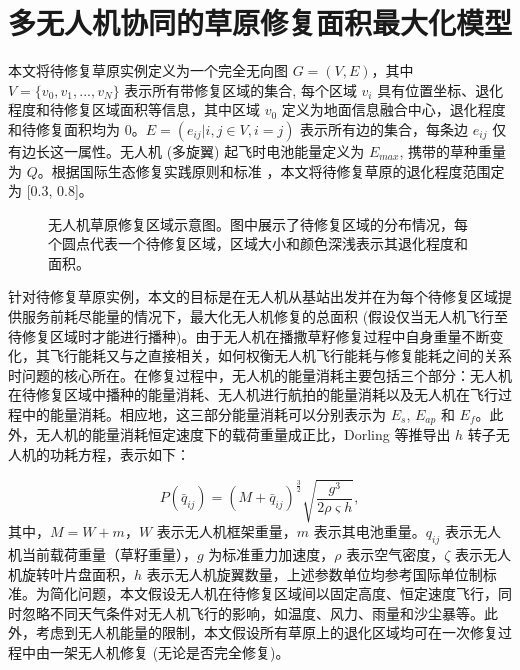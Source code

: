 \documentclass[AutoFakeBold]{LZUThesis}
\begin{document}


\chapter{多无人机协同的草原修复面积最大化模型}

本文将待修复草原实例定义为一个完全无向图 $G = (V, E)$，其中 $V = \{v_0, v_1, ..., v_N \}$ 表示所有带修复区域的集合, 每个区域 $v_i$ 具有位置坐标、退化程度和待修复区域面积等信息，其中区域 $v_0$ 定义为地面信息融合中心，退化程度和待修复面积均为 0。$E = (e_{ij} |i, j \in V, i = j)$ 表示所有边的集合，每条边 $e_{ij}$ 仅有边长这一属性。无人机 (多旋翼) 起飞时电池能量定义为 $E_{max}$, 携带的草种重量为 $Q$。根据国际生态修复实践原则和标准\cite{gann2019international} ，本文将待修复草原的退化程度范围定为 [0.3, 0.8]。

\begin{figure}[htbp]
	\centering
	
	\caption{无人机草原修复区域示意图。图中展示了待修复区域的分布情况，每个圆点代表一个待修复区域，区域大小和颜色深浅表示其退化程度和面积。}
	\label{fig:restored-areas}
\end{figure}

针对待修复草原实例，本文的目标是在无人机从基站出发并在为每个待修复区域提供服务前耗尽能量的情况下，最大化无人机修复的总面积 (假设仅当无人机飞行至待修复区域时才能进行播种)。由于无人机在播撒草籽修复过程中自身重量不断变化，其飞行能耗又与之直接相关，如何权衡无人机飞行能耗与修复能耗之间的关系时问题的核心所在。在修复过程中，无人机的能量消耗主要包括三个部分：无人机在待修复区域中播种的能量消耗、无人机进行航拍的能量消耗以及无人机在飞行过程中的能量消耗。相应地，这三部分能量消耗可以分别表示为 $E_s$, $E_{ap}$ 和 $E_f$。此外，无人机的能量消耗恒定速度下的载荷重量成正比，Dorling\cite{dorling2016vehicle} 等推导出 $h$ 转子无人机的功耗方程，表示如下：


\begin{equation} \label{approximation-power-consumption}
	P(\bar{q}_{ij}) = (M + \bar{q}_{ij})^{\frac{3}{2}}\sqrt{\frac{g^3}{2 \rho \varsigma h}},
\end{equation}
其中，$M = W + m$，$W$ 表示无人机框架重量，$m$ 表示其电池重量。$q_{ij}$ 表示无人机当前载荷重量（草籽重量），$g$ 为标准重力加速度，$\rho$ 表示空气密度，$\zeta$ 表示无人机旋转叶片盘面积，$h$ 表示无人机旋翼数量，上述参数单位均参考国际单位制标准。为简化问题，本文假设无人机在待修复区域间以固定高度、恒定速度飞行，同时忽略不同天气条件对无人机飞行的影响，如温度、风力、雨量和沙尘暴等。此外，考虑到无人机能量的限制，本文假设所有草原上的退化区域均可在一次修复过程中由一架无人机修复 (无论是否完全修复)。
\end{document}
